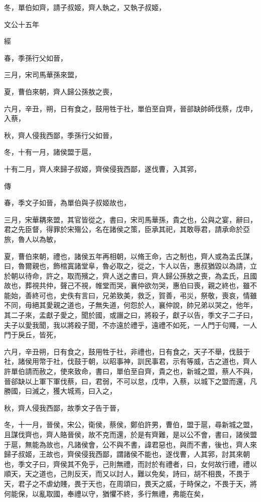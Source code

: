 \documentclass{ctexart}
\begin{document}
冬，單伯如齊，請子叔姬，齊人執之，又執子叔姬，





文公十五年


經



春，季孫行父如晉，

三月，宋司馬華孫來盟，

夏，曹伯來朝，齊人歸公孫敖之喪，

六月，辛丑，朔，日有食之，鼓用牲于社，單伯至自齊，晉郤缺帥師伐蔡，戊申，入蔡，

秋，齊人侵我西鄙，季孫行父如晉，

冬，十有一月，諸侯盟于扈，

十有二月，齊人來歸子叔姬，齊侯侵我西鄙，遂伐曹，入其郛，

傳



春，季文子如晉，為單伯與子叔姬故也，

三月，宋華耦來盟，其官皆從之，書曰，宋司馬華孫，貴之也，公與之宴，辭曰，君之先臣督，得罪於宋殤公，名在諸侯之策，臣承其祀，其敢辱君，請承命於亞旅，魯人以為敏，

夏，曹伯來朝，禮也，諸侯五年再相朝，以脩王命，古之制也，齊人或為孟氏謀，曰，魯爾親也，飾棺寘諸堂阜，魯必取之，從之，卞人以告，惠叔猶毀以為請，立於朝以待命，許之，取而殯之，齊人送之書曰，齊人歸公孫敖之喪，為孟氏，且國故也，葬視共仲，聲己不視，帷堂而哭，襄仲欲勿哭，惠伯曰喪，親之終也，雖不能始，善終可也，史佚有言曰，兄弟致美，救乏，賀善，弔災，祭敬，喪哀，情雖不同，毋絕其愛親之道也，子無失道，何怨於人，襄仲說，帥兄弟以哭之，他年，其二子來，孟獻子愛之，聞於國，或譖之曰，將殺子，獻子以告，季文子二子曰，夫子以愛我聞，我以將殺子聞，不亦遠於禮乎，遠禮不如死，一人門于句鼆，一人門于戾丘，皆死，

六月，辛丑朔，日有食之，鼓用牲于社，非禮也，日有食之，天子不舉，伐鼓于社，諸侯用幣于社，伐鼓于朝，以昭事神，訓民事君，示有等威，古之道也，齊人許單伯請而赦之，使來致命，書曰，單伯至自齊，貴之也，新城之盟，蔡人不與，晉郤缺以上軍下軍伐蔡，曰，君弱，不可以怠，戊申，入蔡，以城下之盟而還，凡勝國，曰滅之，獲大城焉，曰入之，

秋，齊人侵我西鄙，故季文子告于晉，

冬，十一月，晉侯，宋公，衛侯，蔡侯，鄭伯許男，曹伯，盟于扈，尋新城之盟，且謀伐齊也，齊人賂晉侯，故不克而還，於是有齊難，是以公不會，書曰，諸侯盟于扈，無能為故也，凡諸侯會，公不與不書，諱君惡也，與而不書，後也，齊人來歸子叔姬，王故也，齊侯侵我西鄙，謂諸侯不能也，遂伐曹，人其郛，討其來朝也，季文子曰，齊侯其不免乎，己則無禮，而討於有禮者，曰，女何故行禮，禮以順天，天之道也，己則反天，而又以討人，難以免矣，詩曰，胡不相畏，不畏于天，君子之不虐幼賤，畏于天也，在周頌曰，畏天之威，于時保之，不畏于天，將何能保，以亂取國，奉禮以守，猶懼不終，多行無禮，弗能在矣，
\end{document}
